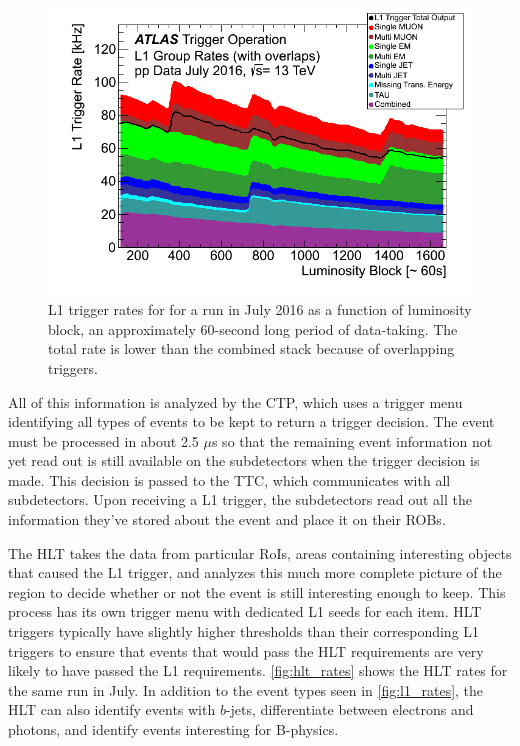 \begin{centering}
\begin{figure}[!hbt]
\myfloatalign
\includegraphics[width=.90\linewidth]{figures/atlas/Time_L1GroupRate_Stack_2016_07.png}
\caption{\ac{L1} trigger rates for for a run in July 2016 as a function of luminosity block, an approximately 60-second long period of data-taking. The total rate is lower than the combined stack because of overlapping triggers.}
\label{fig:l1_rates}
\end{figure}
\end{centering}


All of this information is analyzed by the \ac{CTP}, which uses a trigger menu identifying all types of events to be kept to return a trigger decision. The event must be processed in about 2.5 $\mu$s so that the remaining event information not yet read out is still available on the subdetectors when the trigger decision is made. This decision is passed to the \ac{TTC}, which communicates with all subdetectors. Upon receiving a \ac{L1} trigger, the subdetectors read out all the information they've stored about the event and place it on their \acp{ROB}.

The \ac{HLT} takes the data from particular \acp{RoI}, areas containing interesting objects that caused the \ac{L1} trigger, and analyzes this much more complete picture of the region to decide whether or not the event is still interesting enough to keep. This process has its own trigger menu with dedicated \ac{L1} seeds for each item. \ac{HLT} triggers typically have slightly higher thresholds than their corresponding \ac{L1} triggers to ensure that events that would pass the \ac{HLT} requirements are very likely to have passed the \ac{L1} requirements. \autoref{fig:hlt_rates} shows the \ac{HLT} rates for the same run in July. In addition to the event types seen in \autoref{fig:l1_rates}, the \ac{HLT} can also identify events with $b$-jets, differentiate between electrons and photons, and identify events interesting for B-physics. 

